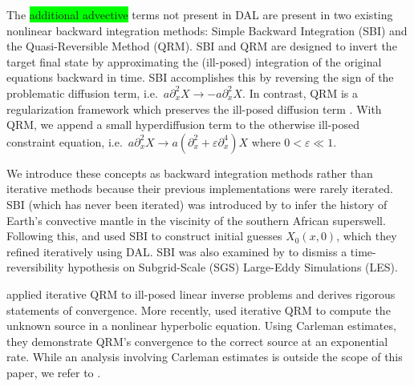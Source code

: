 \documentclass[%
 reprint,
 amsmath,amssymb,
 aps,
 pre,
]{revtex4-2}
\begin{document}
The \colorbox{lime}{additional advective} terms not present in DAL are present in two existing nonlinear backward integration methods: Simple Backward Integration (SBI) and the Quasi-Reversible Method (QRM). 
SBI and QRM are designed to invert the target final state by approximating the (ill-posed) integration of the original equations backward in time.
SBI accomplishes this by reversing the sign of the problematic diffusion term, i.e.~$a\partial_x^2 X \to -a\partial^2_x X$.
In contrast, QRM is a regularization framework which preserves the ill-posed diffusion term \cite{qrmsource}.
With QRM, we append a small hyperdiffusion term to the otherwise ill-posed constraint equation, i.e.~$a\partial_x^2 X \to a(\partial^2_x + \varepsilon\partial^4_x) X$ where $0<\varepsilon\ll 1$. 

We introduce these concepts as backward integration methods rather than iterative methods because their previous implementations were rarely iterated.
SBI (which has never been iterated) was introduced by \cite{Conrad2003} to infer the history of Earth's convective mantle in the viscinity of the southern African superswell.
Following this, \cite{Liu2008} and \cite{Li2017} used SBI to construct initial guesses $X_0(x,0)$, which they refined iteratively using DAL.
SBI was also examined by \cite{Fang2012} to dismiss a time-reversibility hypothesis on Subgrid-Scale (SGS) Large-Eddy Simulations (LES). 

\cite{darde2016} applied iterative QRM to ill-posed linear inverse problems and derives rigorous statements of convergence.
More recently, \cite{Nguyen2022} used iterative QRM to compute the unknown source in a nonlinear hyperbolic equation.
Using Carleman estimates, they demonstrate QRM's convergence to the correct source at an exponential rate.
While an analysis involving Carleman estimates is outside the scope of this paper, we refer to \cite{imanuvilov_2022}.


\end{document}
